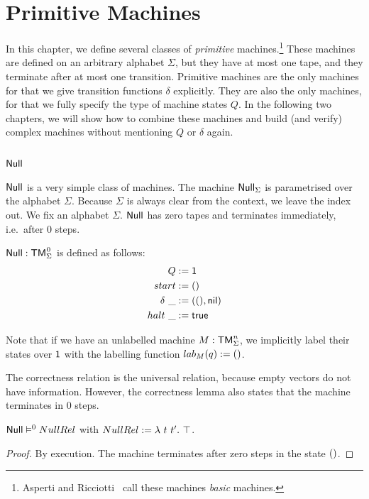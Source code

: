 \chapter{Primitive Machines}
\label{chap:basic}

In this chapter, we define several classes of \textit{primitive} machines.\footnote{Asperti and Ricciotti~\cite{asperti2015} call these machines
  \textit{basic} machines.}  These machines are defined on an arbitrary alphabet $\Sigma$, but they have at most one tape, and they terminate after at
most one transition.  Primitive machines are the only machines for that we give transition functions $\delta$ explicitly.  They are also the only
machines, for that we fully specify the type of machine states $Q$.  In the following two chapters, we will show how to combine these machines and
build (and verify) complex machines without mentioning $Q$ or $\delta$ again.


\section{$\MS{Null}$}
\label{sec:Null}



$\MS{Null}$ is a very simple class of machines.  The machine $\mathsf{Null}_\Sigma$ is parametrised over the alphabet $\Sigma$.  Because $\Sigma$ is
always clear from the context, we leave the index out.  We fix an alphabet $\Sigma$.  $\MS{Null}$ has zero tapes and terminates immediately, i.e.\
after $0$ steps.

\begin{definition}[$\MS{Null}$][Null]
  \label{def:Null}
  $\MS{Null} : \TM_\Sigma^{\mkern+1mu 0}$ is defined as follows:
  \begin{align*}
    Q          &:= \mathsf{1} \\
    start      &:= \mathsf{()} \\
    \delta ~\_ &:= (\mathsf{()}, \mathsf{nil}) \\
    halt   ~\_ &:= \mathsf{true}
  \end{align*}
\end{definition}
Note that if we have an unlabelled machine $M:\mathsf{TM}_\Sigma^n$, we implicitly label their states over $\mathsf{1}$ with the labelling function
$lab_M(q):=\mathsf{()}$.

The correctness relation is the universal relation, because empty vectors do not have information.  However, the correctness lemma also states that
the machine terminates in $0$ steps.
\begin{lemma}
  \label{lem:Null_Sem} $\mathsf{Null} \mathrel{\vDash^{0}} NullRel$ with $NullRel := \lambda~t~t'.~ \top$.
\end{lemma}
\begin{proof}
  By execution.  The machine terminates after zero steps in the state $\mathsf{()}$.
\end{proof}

